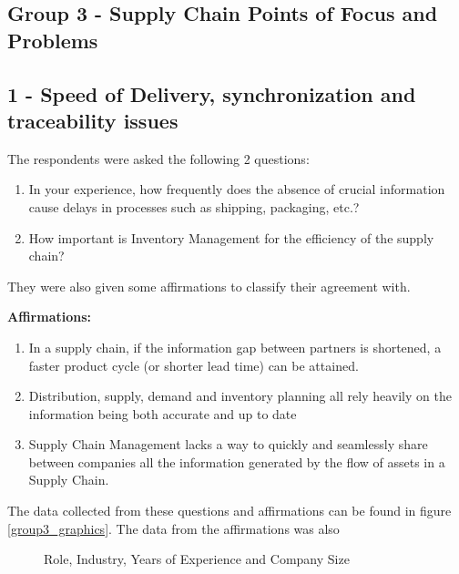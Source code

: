 \subsection{Group 3 - Supply Chain Points of Focus and Problems}

\subsection*{1 - Speed of Delivery, synchronization and traceability issues}

The respondents were asked the following 2 questions:
\begin{enumerate}
  \item In your experience, how frequently does the absence of crucial information cause delays in processes such as shipping, packaging, etc.?
  \item How important is Inventory Management for the efficiency of the supply chain?
\end{enumerate}
They were also given some affirmations to classify their agreement with. 
\par\textbf{Affirmations:}
\begin{enumerate}

\item In a supply chain, if the information gap between partners is shortened, a faster product cycle (or shorter lead time) can be attained.
\item Distribution, supply, demand and inventory planning all rely heavily on the information being both accurate and up to date

\item Supply Chain Management lacks a way to quickly and seamlessly share between companies all the information generated by the flow of assets in a Supply Chain.
\end{enumerate}

The data collected from these questions and affirmations can be found in figure \ref{group3_graphics}. The data from the affirmations was also


\begin{figure}[h]



      \caption{Role, Industry, Years of Experience and Company Size}
    \label{fig:group3_graphics}
\end{figure}







